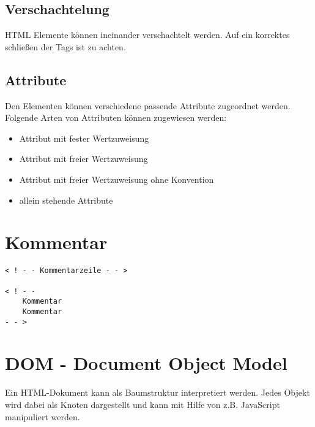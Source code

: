 \subsection*{Verschachtelung}
HTML Elemente können ineinander verschachtelt werden. Auf ein korrektes schließen der Tags ist zu achten.
\subsection*{Attribute}
Den Elementen können verschiedene passende Attribute zugeordnet werden. Folgende Arten von Attributen können zugewiesen werden:
\begin{itemize}
\item Attribut mit fester Wertzuweisung
\item Attribut mit freier Wertzuweisung
\item Attribut mit freier Wertzuweisung ohne Konvention
\item allein stehende Attribute
\end{itemize}
\section{Kommentar}
\begin{lstlisting}[caption=''Kommentare in HTML'']
< ! - - Kommentarzeile - - >

< ! - - 
	Kommentar
	Kommentar
- - >
\end{lstlisting}
\section{DOM - Document Object Model}
Ein HTML-Dokument kann als Baumstruktur interpretiert werden. Jedes Objekt wird dabei als Knoten dargestellt und kann mit Hilfe von z.B. JavaScript manipuliert werden.



